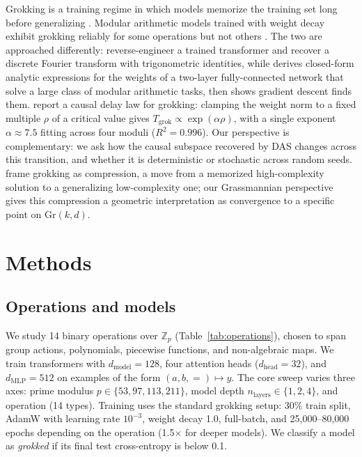 \documentclass{article}
\newcommand{\Gr}{\mathrm{Gr}}
\newcommand{\Z}{\mathbb{Z}}
\begin{document}
Grokking is a training regime in which models memorize the training set long
before generalizing \citep{power2022grokking}. Modular arithmetic models trained
with weight decay exhibit grokking reliably for some operations but not others
\citep{nanda2023progress, zhong2024clock}. The two are approached differently:
\citet{nanda2023progress} reverse-engineer a trained transformer and recover a
discrete Fourier transform with trigonometric identities, while
\citet{gromov2023grokking} derives closed-form analytic expressions for the
weights of a two-layer fully-connected network that solve a large class of
modular arithmetic tasks, then shows gradient descent finds them.
\citet{khanh2026scaling} report a causal delay law for grokking: clamping the
weight norm to a fixed multiple $\rho$ of a critical value gives
$T_\text{grok} \propto \exp(\alpha \rho)$, with a single exponent
$\alpha \approx 7.5$ fitting across four moduli ($R^2 = 0.996$).
Our perspective is complementary: we ask how the causal subspace recovered by
DAS changes across this transition, and whether it is deterministic or
stochastic across random seeds.
\citet{liu2023grokking} frame grokking as compression, a move from a memorized high-complexity solution
to a generalizing low-complexity one; our Grassmannian
perspective gives this compression a geometric interpretation as convergence to a
specific point on $\Gr(k,d)$.


\section{Methods}
\label{sec:methods}

\subsection{Operations and models}

We study 14 binary operations over $\Z_p$ (Table~\ref{tab:operations}), chosen
to span group actions, polynomials, piecewise functions, and non-algebraic maps.
We train transformers with $d_\text{model} = 128$, four attention heads
($d_\text{head} = 32$), and $d_\text{MLP} = 512$ on examples of the form
$(a, b, {=}) \mapsto y$. The core sweep varies three axes: prime modulus
$p \in \{53, 97, 113, 211\}$, model depth $n_\text{layers} \in \{1, 2, 4\}$,
and operation (14 types). Training uses
the standard grokking setup: 30\% train split, AdamW with learning rate
$10^{-3}$, weight decay 1.0, full-batch, and 25{,}000--80{,}000 epochs
depending on the operation (1.5$\times$ for deeper models). We classify a
model as \emph{grokked} if its final test cross-entropy is below 0.1.
\end{document}
